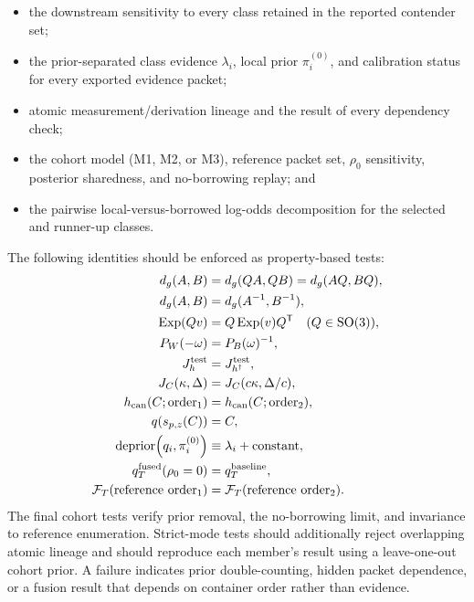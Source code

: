 \documentclass[11pt]{article}
\newcommand{\SO}{\mathrm{SO}(3)}
\newcommand{\T}{\mathsf{T}}
\newcommand{\Exp}{\operatorname{Exp}}
\begin{document}
\begin{itemize}[nosep]
    \item the downstream sensitivity to every class retained in the reported contender set;
    \item the prior-separated class evidence $\lambda_i$, local prior $\pi_i^{(0)}$, and
    calibration status for every exported evidence packet;
    \item atomic measurement/derivation lineage and the result of every dependency check;
    \item the cohort model (M1, M2, or M3), reference packet set, $\rho_0$ sensitivity,
    posterior sharedness, and no-borrowing replay; and
    \item the pairwise local-versus-borrowed log-odds decomposition for the selected and
    runner-up classes.
    \end{itemize}

    The following identities should be enforced as property-based tests:
    \begin{align}
        d_g(A,B)&=d_g(QA,QB)=d_g(AQ,BQ),\\
        d_g(A,B)&=d_g(A^{-1},B^{-1}),\\
        \Exp(Qv)&=Q\Exp(v)Q^{\T} \quad (Q\in\SO),\\
        P_W(-\omega)&=P_B(\omega)^{-1},\\
        J_h^{\rm test}&=J_{h^\dagger}^{\rm test},\\
        J_C(\kappa,\Delta)&=J_C(c\kappa,\Delta/c),\\
        h_{\mathrm{can}}(C;\text{order}_1)&=h_{\mathrm{can}}(C;\text{order}_2),\\
        q\!\left(s_{p,z}(C)\right)&=C,\\
        \operatorname{deprior}\!\left(q_i,\pi_i^{(0)}\right)&\equiv\lambda_i+\text{constant},\\
        q_T^{\mathrm{fused}}(\rho_0=0)&=q_T^{\mathrm{baseline}},\\
        \mathcal F_T(\text{reference order}_1)&=\mathcal F_T(\text{reference order}_2).
    \end{align}
    The final cohort tests verify prior removal, the no-borrowing limit, and invariance to
    reference enumeration. Strict-mode tests should additionally reject overlapping atomic
    lineage and should reproduce each member's result using a leave-one-out cohort prior. A
    failure indicates prior double-counting, hidden packet dependence, or a fusion result that
    depends on container order rather than evidence.
\end{document}
